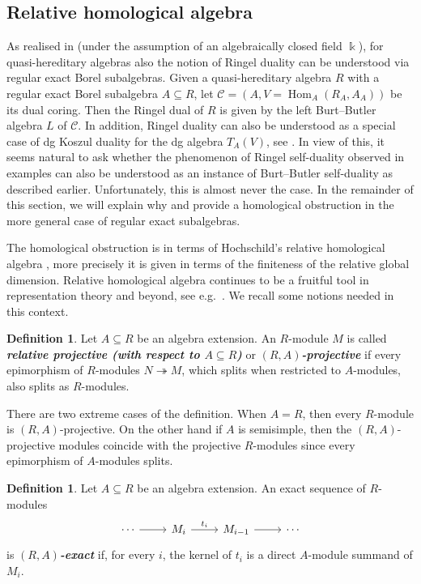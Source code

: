 \documentclass[12pt,a4paper]{amsart}
\theoremstyle{plain}
\theoremstyle{definition}
\newtheorem{defn}[thm]{Definition}
\numberwithin{equation}{thm}
\newcommand{\emphbf}[1]{\emph{\textbf{#1}}}
\DeclareMathOperator{\Hom}{Hom}
\begin{document}
\subsection{Relative homological algebra}
As realised in \cite{KKO14,BKK20} (under the assumption of an algebraically closed field $\Bbbk$), for quasi-hereditary algebras also the notion of Ringel duality can be understood via regular exact Borel subalgebras. Given a quasi-hereditary algebra $R$ with a regular exact Borel subalgebra $A\subseteq R$, let $\mathcal{C}= (A, V={\Hom_{A}(R_A,A_A)})$ be its dual coring. Then the Ringel dual of $R$ is given by the left Burt--Butler algebra $L$ of $\mathcal{C}$. In addition, Ringel duality can also be understood as a special case of dg Koszul duality for the dg algebra $T_A(V)$, see \cite{Ovs06,BK18}. In view of this, it seems natural to ask whether the phenomenon of Ringel self-duality observed in examples can also be understood as an instance of Burt--Butler self-duality as described earlier. Unfortunately, this is almost never the case. In the remainder of this section, we will explain why and provide a homological obstruction in the more general case of regular exact subalgebras. 

The homological obstruction is in terms of Hochschild's relative homological algebra \cite{Hoc56}, more precisely it is given in terms of the finiteness of the relative global dimension. Relative homological algebra continues to be a fruitful tool in representation theory and beyond, see e.g.~\cite{XX13, IMP24}. We recall some notions needed in this context.  

\begin{defn}
Let $A\subseteq R$ be an algebra extension. An $R$-module $M$ is called \emphbf{relative projective (with respect to $A\subseteq R$)} or \emphbf{$(R,A)$-projective} if every epimorphism of $R$-modules $N\twoheadrightarrow M$, which splits when restricted to $A$-modules, also splits as $R$-modules.   
\end{defn}

There are two extreme cases of the definition. When $A=R$, then every $R$-module is $(R,A)$-projective. On the other hand if $A$ is semisimple, then the $(R,A)$-projective modules coincide with the projective $R$-modules since every epimorphism of $A$-modules splits. 

\begin{defn}
    Let $A\subseteq R$ be an algebra extension. An exact sequence of $R$-modules
   \[\begin{tikzcd}
	\cdots & {M_i} & {M_{i-1}} & \cdots
	\arrow[from=1-1, to=1-2]
	\arrow["{t_i}", from=1-2, to=1-3]
	\arrow[from=1-3, to=1-4]
\end{tikzcd}\]
is \emphbf{$(R,A)$-exact} if, for every $i$, the kernel of $t_i$ is a direct $A$-module summand of $M_i$.
\end{defn}
\end{document}
